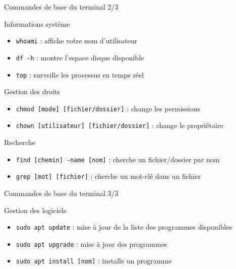 \documentclass[aspectratio=169,xcolor=dvipsnames]{beamer}
\begin{document}

\begin{frame}{Commandes de base du terminal 2/3}

    Informations système
    \begin{itemize}
        \item \texttt{whoami} : affiche votre nom d'utilisateur
        \item \texttt{df -h} : montre l'espace disque disponible
        \item \texttt{top} : surveille les processus en temps réel
    \end{itemize}

    Gestion des droits
    \begin{itemize}
        \item \texttt{chmod [mode] [fichier/dossier]} : change les permissions
        \item \texttt{chown [utilisateur] [fichier/dossier]} : change le propriétaire
    \end{itemize}

Recherche
    \begin{itemize}
        \item \texttt{find [chemin] -name [nom]} : cherche un fichier/dossier par nom
        \item \texttt{grep [mot] [fichier]} : cherche un mot-clé dans un fichier
    \end{itemize}

\end{frame}


\begin{frame}{Commandes de base du terminal 3/3}

    Gestion des logiciels
    \begin{itemize}
        \item \texttt{sudo apt update} : mise à jour de la liste des programmes disponibles
        \item \texttt{sudo apt upgrade} : mise à jour des programmes
        \item \texttt{sudo apt install [nom]} : installe un programme
    \end{itemize}

\end{frame}

\end{document}
